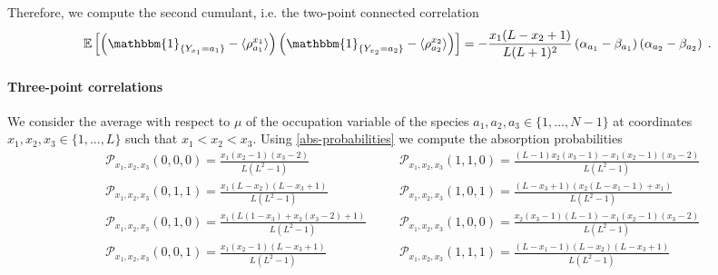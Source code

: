 \documentclass[10pt]{article}
\numberwithin{equation}{section}
\numberwithin{equation}{subsection}
\newcommand{\dt}{\;.}
\begin{document}
Therefore, we compute the second cumulant, i.e. the two-point connected correlation
\begin{equation}\label{two-pts-corr}
	\begin{split}
		 \mathbb{E}\left[\left(\mathbbm{1}_{\{Y_{x_{1}}=a_{1}\}}-\langle\rho_{a_{1}}^{x_{1}}\rangle \right)\left(\mathbbm{1}_{\{Y_{x_{2}}=a_{2}\}}-\langle\rho_{a_{2}}^{x_{2}}\rangle \right)\right]=-\frac{x_{1}(L-x_{2}+1)}{L(L+1)^{2}}\left(\alpha_{a_{1}}-\beta_{a_{1}}\right)\left(\alpha_{a_{2}}-\beta_{a_{2}}\right)\dt
	\end{split}
\end{equation} 
\paragraph{Three-point correlations}
We consider the average with respect to $\mu$ of the occupation variable of the species  $a_{1},a_{2},a_{3}\in \{1,\ldots,N-1\}$ at coordinates $x_{1},x_{2},x_{3}\in \{1,\ldots,L\}$ such that $x_{1}<x_{2}<x_{3}$. Using \eqref{abs-probabilities} we compute the absorption probabilities 
\begin{equation}
	\begin{split}
	&\mathcal{P}_{x_{1},x_{2},x_{3}}(0,0,0)=\frac{x_{1}(x_{2}-1)(x_{3}-2)}{L(L^{2}-1)}\\
 &\mathcal{P}_{x_{1},x_{2},x_{3}}(0,1,1)=\frac{x_1 (L-x_2) (L-x_3+1)}{L \left(L^2-1\right)}\\
	&\mathcal{P}_{x_{1},x_{2},x_{3}}(0,1,0)=\frac{x_1 (L(1-x_3)+x_2 (x_3-2)+1)}{L(L^2-1)}\\
	&\mathcal{P}_{x_{1},x_{2},x_{3}}(0,0,1)=\frac{x_1 (x_2-1) (L-x_3+1)}{L \left(L^2-1\right)}
	\end{split}\quad \begin{split}
	&\mathcal{P}_{x_{1},x_{2},x_{3}}(1,1,0)=\frac{(L-1) x_2 (x_3-1)-x_1 (x_2-1)
		(x_3-2)}{L \left(L^2-1\right)}\\
	&\mathcal{P}_{x_{1},x_{2},x_{3}}(1,0,1)=\frac{(L-x_3+1) (x_2 (L-x_1-1)+x_1)}{L
		\left(L^2-1\right)}\\
	&\mathcal{P}_{x_{1},x_{2},x_{3}}(1,0,0)=\frac{ x_{2} (x_3-1)(L-1)-x_1 (x_2-1)
	(x_3-2)}{L \left(L^2-1\right)}\\
	&\mathcal{P}_{x_{1},x_{2},x_{3}}(1,1,1)=\frac{(L-x_{1}-1)(L-x_{2})(L-x_{3}+1)}{L(L^{2}-1)}
\end{split}
\end{equation}
\end{document}
